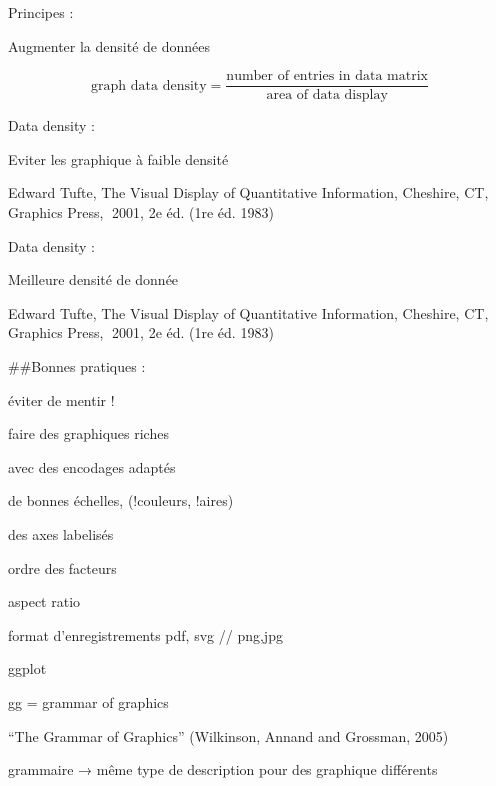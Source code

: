 \documentclass[ignorenonframetext,]{beamer}
\begin{document}
\begin{frame}{}
\protect\hypertarget{section-21}{}

Principes :

Augmenter la densité de données

\[\textrm{graph data density} = \frac{\textrm{number of entries in data matrix}}{\textrm{area of data display}}\]

\end{frame}

\begin{frame}{}
\protect\hypertarget{section-22}{}

Data density :

Eviter les graphique à faible densité

Edward Tufte, The Visual Display of Quantitative Information, Cheshire,
CT, Graphics Press, 2001, 2e éd. (1re éd. 1983)

\end{frame}

\begin{frame}{}
\protect\hypertarget{section-23}{}

Data density :

Meilleure densité de donnée

Edward Tufte, The Visual Display of Quantitative Information, Cheshire,
CT, Graphics Press, 2001, 2e éd. (1re éd. 1983)

\#\#{Bonnes pratiques :}

éviter de mentir !

faire des graphiques riches

avec des encodages adaptés

de bonnes échelles, (!couleurs, !aires)

des axes labelisés

ordre des facteurs

aspect ratio

format d'enregistrements pdf, svg // png,jpg

\end{frame}

\begin{frame}{{ggplot}}
\protect\hypertarget{ggplot}{}

gg = { grammar of graphics }

``The Grammar of Graphics'' (Wilkinson, Annand and Grossman, 2005)

grammaire → même type de description pour des graphique différents

\end{frame}
\end{document}
